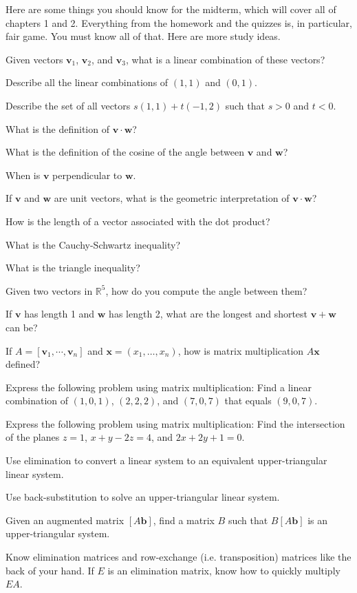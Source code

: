 \documentclass[minion]{homework}
\newcommand{\vx}{\mathbf{x}}
\newcommand{\vb}{\mathbf{b}}
\newcommand{\vv}{\mathbf{v}}
\newcommand{\vw}{\mathbf{w}}
\begin{document}
Here are some things you should know for the midterm, which will cover all of chapters 1 and 2.  Everything from the homework and the quizzes is, in particular, fair game.  You must know all of that.  Here are more study ideas.

Given vectors $\vv_1$, $\vv_2$, and $\vv_3$, what is a linear combination of these vectors?

Describe all the linear combinations of $(1,1)$ and $(0,1)$.

Describe the set of all vectors $s(1,1)+t(-1,2)$ such that $s>0$ and $t<0$.

What is the definition of $\vv\cdot \vw$?

What is the definition of the cosine of the angle between $\vv$ and $\vw$?

When is $\vv$ perpendicular to $\vw$.

If $\vv$ and $\vw$ are unit vectors, what is the geometric interpretation of $\vv\cdot \vw$?

How is the length of a vector associated with the dot product?

What is the Cauchy-Schwartz inequality?

What is the triangle inequality?

Given two vectors in $\mathbb R^5$, how do you compute the angle between them?

If $\vv$ has length 1 and $\vw$ has length 2, what are the longest and shortest $\vv+\vw$ can be?

If $A=[\vv_1,\cdots,\vv_n]$ and $\vx=(x_1,\ldots,x_n)$, how is matrix
multiplication $A\vx$ defined?

Express the following problem using matrix multiplication:  Find a linear
combination of $(1,0,1)$, $(2,2,2)$, and $(7,0,7)$ that equals $(9,0,7)$.

Express the following problem using matrix multiplication:  Find the
intersection of the planes $z=1$, $x+y-2z=4$, and $2x+2y+1=0$.

Use elimination to convert a linear system to an equivalent upper-triangular linear system.

Use back-substitution to solve an upper-triangular linear system.

Given an augmented matrix $[A\vb]$, find a matrix $B$ such that
$B[A\vb]$ is an upper-triangular system.

Know elimination matrices and row-exchange (i.e. transposition) matrices like the back of your hand.  If $E$ is an elimination matrix, know how to quickly
multiply $EA$.  
\end{document}
